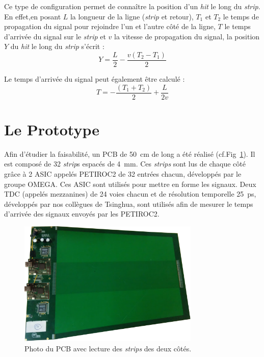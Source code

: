 Ce type de configuration permet de connaître la position d'un \textit{hit} le long du \textit{strip}. En effet,en posant $L$ la longueur de la ligne (\textit{strip} et retour), $T_1$ et $T_2$ le temps de propagation du signal pour rejoindre l'un et l'autre côté de la ligne, $T$ le temps d'arrivée du signal sur le \textit{strip} et $v$ la vitesse de propagation du signal, la position $Y$ du \textit{hit} le long du \textit{strip} s'écrit :
\begin{equation}
\label{eqqq}
Y=\frac{L}{2}-\frac{v(T_2-T_1)}{2}
\end{equation} 

Le temps d'arrivée du signal peut également être calculé :
\begin{equation}
\label{myformule}
T=-\frac{(T_1+T_2)}{2}+\frac{L}{2v}
\end{equation}

\section{Le Prototype}
Afin d'étudier la faisabilité, un PCB de \SI{50}{\centi\meter} de long a été réalisé (cf.Fig~\ref{PCB2}). Il est composé de \num{32} \textit{strip}s espacés de \SI{4}{\milli\meter}. Ces \textit{strips} sont lus de chaque côté grâce à \num{2} ASIC appelés PETIROC2 \cite{Monzo:2017quz} de \num{32} entrées chacun, développés par le groupe OMEGA. Ces ASIC sont utilisés pour mettre en forme les signaux. Deux TDC (appelés mezzanines) de \num{24} voies chacun et de résolution temporelle \SI{25}{\pico\second}, développés par nos collègues de Tsinghua, sont utilisés afin de mesurer le temps d'arrivée des signaux envoyés par les PETIROC2.

\begin{figure}[ht!]
	\centering
	\includegraphics[width=0.77\textwidth]{ELE/PCB2.png}
	\captionsetup{type=figure}\caption{Photo du PCB avec lecture des \textit{strips} des deux côtés.}
	\label{PCB2}
\end{figure}

